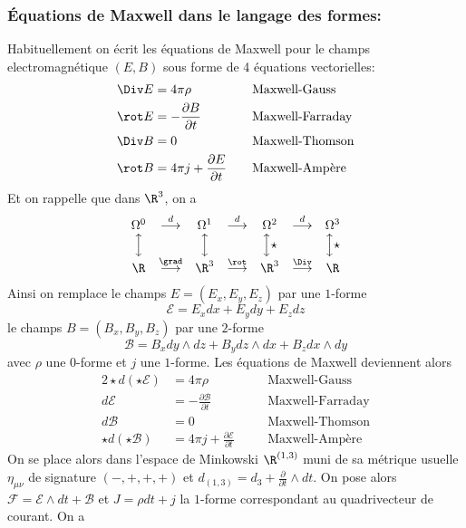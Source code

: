 \subsubsection{Équations de Maxwell dans le langage des formes:}

Habituellement on écrit les équations de Maxwell pour le champs electromagnétique $(E, B)$ sous forme de 4 équations vectorielles:
\begin{alignat*}{2}
\Div E & =  4\pi\rho  && \quad\text{Maxwell-Gauss} \\
\rot E & = - \frac{\partial B}{\partial t}  && \quad\text{Maxwell-Farraday} \\
\Div B & =  0 && \quad\text{Maxwell-Thomson} \\
\rot B & =  4\pi j + \frac{\partial E}{\partial t}  &&\quad\text{Maxwell-Ampère}
\end{alignat*}
Et on rappelle que dans $\R^3$, on a
$$\begin{matrix}
\Omega^0 & \overset{d}{\longrightarrow} & \Omega^1 & \overset{d}{\longrightarrow} & \Omega^2 & \overset{d}{\longrightarrow} & \Omega^3\\
\Big\updownarrow &  & \Big\updownarrow &  & \Big\updownarrow\star &  & \Big\updownarrow\star\\
\R & \overset{\grad}{\longrightarrow} & \R^3 & \overset{\rot}{\longrightarrow} & \R^3 & \overset{\Div}{\longrightarrow} & \R
\end{matrix}
$$
Ainsi on remplace le champs $E = (E_x, E_y, E_z)$ par une $1$-forme 
$$\mathscr{E} = E_x dx + E_y dy + E_z dz$$ 
le champs $B = (B_x, B_y, B_z)$ par une $2$-forme 
$$\mathscr{B} = B_x dy\wedge dz + B_y dz \wedge dx + B_z dx\wedge dy$$
avec $\rho$ une $0$-forme et $j$ une $1$-forme. Les équations de Maxwell deviennent alors
\begin{alignat*}{2}
\star d(\star\mathscr{E}) & =  4\pi\rho  && \quad\text{Maxwell-Gauss} \\
d \mathscr{E} & = - \frac{\partial \mathscr{B}}{\partial t}  && \quad\text{Maxwell-Farraday} \\
d \mathscr{B} & =  0 && \quad\text{Maxwell-Thomson} \\
\star d(\star\mathscr{B}) & =  4\pi j + \frac{\partial \mathscr{E}}{\partial t}  &&\quad\text{Maxwell-Ampère}
\end{alignat*}
On se place alors dans l'espace de Minkowski $\R^{(1, 3)}$ muni de sa métrique usuelle $\eta_{\mu\nu}$ de signature $(-,+,+,+)$ et $d_{(1,3)} = d_3 + \frac{\partial}{\partial t}\wedge dt$. On pose alors $\mathscr{F} = \mathscr{E} \wedge dt + \mathscr{B}$ et $J = \rho dt + j$ la $1$-forme correspondant au quadrivecteur de courant. On a

